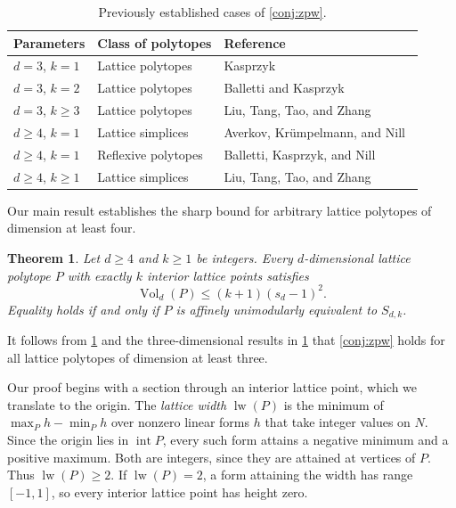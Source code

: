 \documentclass[reqno, 11pt]{article}
\numberwithin{equation}{section}
\newtheorem{theorem}{Theorem}[section]
\theoremstyle{definition}
\DeclareMathOperator{\Vol}{Vol}
\DeclareMathOperator{\lw}{lw}
\DeclareMathOperator{\intr}{int}
\begin{document}
\begin{table}[htbp]
\centering\small
\begin{tabularx}{\textwidth}{@{}ll>{\raggedright\arraybackslash}X@{}}
\toprule
Parameters & Class of polytopes & Reference\\
\midrule
$d=3$, $k=1$ & Lattice polytopes & Kasprzyk~\cite{Kasprzyk}\\
$d=3$, $k=2$ & Lattice polytopes &
  Balletti and Kasprzyk~\cite[Corollary~5.2]{BK}\\
$d=3$, $k\ge3$ & Lattice polytopes &
  Liu, Tang, Tao, and Zhang~\cite[Theorem~1.2]{LTTZ}\\
$d\ge4$, $k=1$ & Lattice simplices &
  Averkov, Kr\"umpelmann, and Nill~\cite[Theorem~2.2]{AKN}\\
$d\ge4$, $k=1$ & Reflexive polytopes &
  Balletti, Kasprzyk, and Nill~\cite[Corollary~1.2]{BKN}\\
$d\ge4$, $k\ge1$ & Lattice simplices &
  Liu, Tang, Tao, and Zhang~\cite[Theorem~1.2]{LTTZII}\\
\bottomrule
\end{tabularx}
\caption{Previously established cases of \cref{conj:zpw}.}\label{tab:known-cases}
\end{table}

Our main result establishes the sharp bound for arbitrary lattice
polytopes of dimension at least four.

\begin{theorem}\label{thm:general-zpw}
Let $d\ge4$ and $k\ge1$ be integers. Every $d$-dimensional lattice
polytope $P$ with exactly $k$ interior lattice points satisfies
\[
                        \Vol_d(P)\le(k+1)(s_d-1)^2 .
\]
Equality holds if and only if $P$ is affinely unimodularly equivalent
to $S_{d,k}$.
\end{theorem}

It follows from \cref{thm:general-zpw} and the three-dimensional
results in \cref{tab:known-cases} that \cref{conj:zpw} holds for
all lattice polytopes of dimension at least three.

Our proof begins with a section through an interior lattice point,
which we translate to the origin. The \emph{lattice width} $\lw(P)$
is the minimum of $\max_P h-\min_P h$ over nonzero linear forms $h$
that take integer values on $N$. Since the origin lies in $\intr P$,
every such form attains a negative minimum and a positive maximum.
Both are integers, since they are attained at vertices of $P$.
Thus $\lw(P)\ge2$. If $\lw(P)=2$, a form attaining the width has
range $[-1,1]$, so every interior lattice point has height zero.
\end{document}
